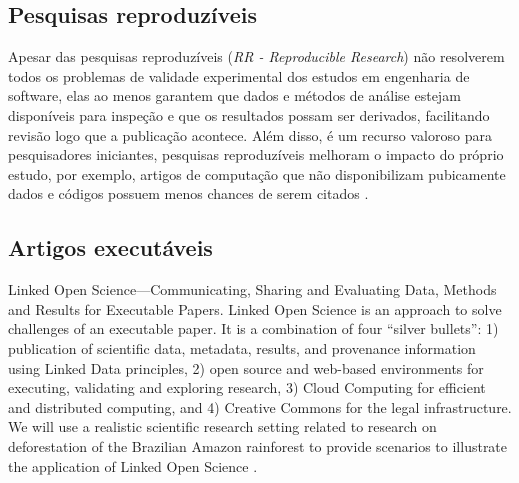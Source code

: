 


\subsection{Pesquisas reproduzíveis}

Apesar das pesquisas reproduzíveis ({\it RR - Reproducible Research}) não
resolverem todos os problemas de validade experimental dos estudos em
engenharia de software, elas ao menos garantem que dados e métodos de análise
estejam disponíveis para inspeção e que os resultados possam ser derivados,
facilitando revisão logo que a publicação acontece. Além disso, é um recurso
valoroso para pesquisadores iniciantes, pesquisas reproduzíveis melhoram o
impacto do próprio estudo, por exemplo, artigos de computação que não
disponibilizam pubicamente dados e códigos possuem menos chances de serem
citados \cite{madeyski_would_2017}.

\subsection{Artigos executáveis}

Linked Open Science—Communicating, Sharing and Evaluating
Data, Methods and Results for Executable Papers.
Linked Open Science is an approach to solve challenges of an executable paper. It is a combination of four “silver
bullets”: 1) publication of scientific data, metadata, results, and provenance information using Linked Data principles,
2) open source and web-based environments for executing, validating and exploring research, 3) Cloud Computing
for efficient and distributed computing, and 4) Creative Commons for the legal infrastructure. We will use a realistic
scientific research setting related to research on deforestation of the Brazilian Amazon rainforest to provide scenarios
to illustrate the application of Linked Open Science \cite{kauppinen_linked_2011}.

